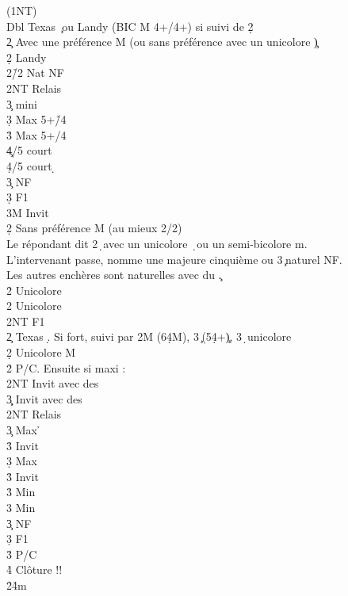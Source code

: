 \documentclass[a4paper]{article}
\begin{document}
\begin{bidtable}
(1NT)\+\\
Dbl \> Texas \c\ ou Landy (BIC M 4+/4+) si suivi de 2\d \+\\
2\c \> Avec une préférence M (ou sans préférence avec un unicolore \c )\+\\
2\d \> Landy\+\\
2\h/2\s \> Nat NF\\
2NT \> Relais\+\\
3\c \> mini\\
3\d \> Max 5+\h /4\s \\
3\h \> Max 5+\s /4\h \\
4\c {}/5 court \c \\
4\d {}/5 court \d \-\\
3\c \> NF\\
3\d \> F1\\
3M \> Invit\-\-\\
2\d \> Sans préférence M (au mieux 2/2)\\
\>Le répondant dit 2\d\ avec un unicolore \d\ ou un semi-bicolore m. \\
\>L'intervenant passe, nomme une majeure cinquième ou 3\c\ naturel NF. \\
\>Les autres enchères sont naturelles avec du \c .\\
2\h \> Unicolore\\
2\s \> Unicolore\\
2NT \> F1\-\\
2\c \> Texas \d . Si fort, suivi par 2M (6\d 4M), 3\c\ (5\d 4+\c ), 3\d\ unicolore\\
2\d \> Unicolore M\+\\
2\h\s \> P/C. Ensuite si maxi :\+\\
2NT \> Invit avec des \h \\
3\c\d \> Invit avec des \s \-\\
2NT \> Relais\+\\
3\c \> Max \h \+\\
3\h\s \> Invit\-\\
3\d \> Max \s \+\\
3\h\s \> Invit\-\\
3\h \> Min \h \\
3\s \> Min \s \-\\
3\c \> NF\\
3\d \> F1\\
3\h\s \> P/C\\
4\h\s \> Clôture !!\-\\
2\h {}\h 4m\+\\

\end{bidtable}
\end{document}
